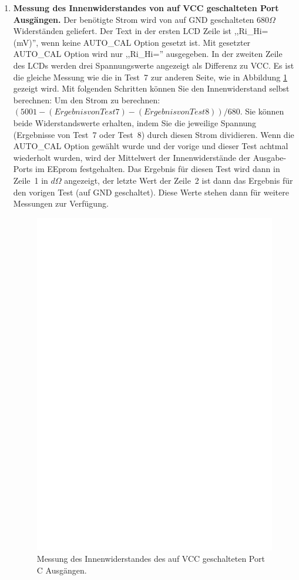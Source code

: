 \begin{enumerate}
\item {\bf Messung des Innenwiderstandes von auf VCC geschalteten Port Ausg\"angen.}
Der ben\"otigte Strom wird von auf GND geschalteten \(680\Omega\) Widerst\"anden geliefert.
Der Text in der ersten LCD Zeile ist ,,Ri\_Hi= (mV)'', wenn keine AUTO\_CAL Option gesetzt ist.
Mit gesetzter AUTO\_CAL Option wird nur ,,Ri\_Hi='' ausgegeben.
In der zweiten Zeile des LCDs werden drei Spannungswerte angezeigt als Differenz zu VCC.
Es ist die gleiche Messung wie die in Test~7 zur anderen Seite, wie in Abbildung \ref{fig:test8} gezeigt wird.
Mit folgenden Schritten k\"onnen Sie den Innenwiderstand selbst berechnen:
Um den Strom zu berechnen: \((5001 - (Ergebnis von Test 7) - (Ergebnis von Test 8)) / 680\).
Sie k\"onnen beide Widerstandswerte erhalten, indem Sie die jeweilige Spannung
(Ergebnisse von Test~7 oder Test~8) durch diesen Strom dividieren.
Wenn die AUTO\_CAL Option gew\"ahlt wurde und der vorige und dieser Test achtmal wiederholt wurden,
wird der Mittelwert der Innenwiderst\"ande der Ausgabe-Ports im EEprom festgehalten.
Das Ergebnis f\"ur diesen Test wird dann in Zeile~1 in \(d\Omega\) angezeigt, der letzte Wert der Zeile~2 ist dann
das Ergebnis f\"ur den vorigen Test (auf GND geschaltet).
Diese Werte stehen dann f\"ur weitere Messungen zur Verf\"ugung.
\begin{figure}[H]
\centering
\includegraphics[]{../FIG/Test8.eps}
\caption{Messung des Innenwiderstandes des auf VCC geschalteten Port C Ausg\"angen.}
\label{fig:test8}
\end{figure}


\end{enumerate}
